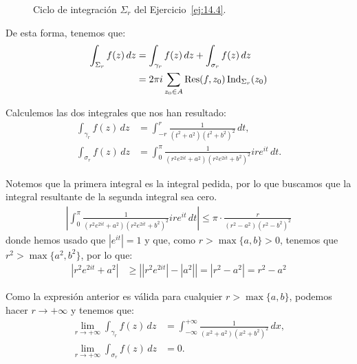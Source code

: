 \begin{ejercicio}
\begin{figure}
        \caption{Ciclo de integración $\Sigma_r$ del Ejercicio~\ref{ej:14.4}.}
        \label{fig:ej:14.4}
    \end{figure}

    De esta forma, tenemos que:
    \begin{align*}
        \int_{\Sigma_r} f(z) \, dz &= \int_{\gamma_r} f(z) \, dz + \int_{\sigma_r} f(z) \, dz \\
        &= 2\pi i\sum_{z_0\in A}\operatorname{Res}(f,z_0)\operatorname{Ind}_{\Sigma_r}(z_0)
    \end{align*}

    Calculemos las dos integrales que nos han resultado:
    \begin{align*}
        \int_{\gamma_r} f(z) \, dz &= \int_{-r}^{r} \frac{1}{(t^2 + a^2)(t^2 + b^2)^2} \, dt, \\
        \int_{\sigma_r} f(z) \, dz &= \int_0^{\pi} \frac{1}{(r^2 e^{2it} + a^2)(r^2 e^{2it} + b^2)^2} i r e^{it} \, dt.
    \end{align*}

    Notemos que la primera integral es la integral pedida, por lo que buscamos que la integral resultante de la segunda integral sea cero.
    \begin{align*}
        \left| \int_0^{\pi} \frac{1}{(r^2 e^{2it} + a^2)(r^2 e^{2it} + b^2)^2} i r e^{it} \, dt \right|
        \leq \pi\cdot \frac{r}{(r^2 - a^2)(r^2 - b^2)^2}
    \end{align*}
    donde hemos usado que $|e^{it}|=1$ y que, como $r>\max\{a,b\}>0$, tenemos que $r^2>\max\{a^2,b^2\}$, por lo que:
    \begin{align*}
        \left| r^2 e^{2it} + a^2 \right| &\geq \left||r^2 e^{2it}| - |a^2|\right| = \left| r^2 - a^2 \right| = r^2 - a^2
    \end{align*}

    Como la expresión anterior es válida para cualquier $r > \max\{a,b\}$, podemos hacer $r \to +\infty$ y tenemos que:
    \begin{align*}
        \lim_{r\to+\infty} \int_{\gamma_r} f(z) \, dz &= \int_{-\infty}^{+\infty} \frac{1}{(x^2 + a^2)(x^2 + b^2)^2} \, dx, \\
        \lim_{r\to+\infty} \int_{\sigma_r} f(z) \, dz &= 0.
    \end{align*}


\end{ejercicio}
